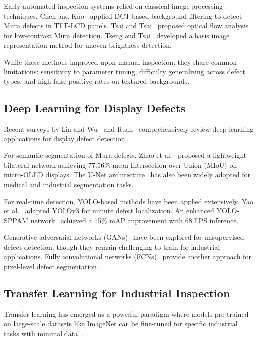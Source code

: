 \documentclass[12pt,a4paper]{article}
\begin{document}
Early automated inspection systems relied on classical image processing 
techniques. Chen and Kuo~\cite{chen2007dct} applied DCT-based background 
filtering to detect Mura defects in TFT-LCD panels. Tsai and Tsai~\cite{tsai2011optical} 
proposed optical flow analysis for low-contrast Mura detection. 
Tseng and Tsai~\cite{tseng2010basis} developed a basis image representation 
method for uneven brightness detection.

While these methods improved upon manual inspection, they share common 
limitations: sensitivity to parameter tuning, difficulty generalizing 
across defect types, and high false positive rates on textured backgrounds.

\subsection{Deep Learning for Display Defects}

Recent surveys by Lin and Wu~\cite{lin2023vision} and Ruan~\cite{ruan2025research} 
comprehensively review deep learning applications for display defect 
detection.

For semantic segmentation of Mura defects, Zhao et al.~\cite{zhao2025lightweight} 
proposed a lightweight bilateral network achieving 77.56\% mean 
Intersection-over-Union (MIoU) on micro-OLED displays. The U-Net 
architecture~\cite{ronneberger2015unet} has also been widely adopted 
for medical and industrial segmentation tasks.

For real-time detection, YOLO-based methods have been applied extensively. 
Yao et al.~\cite{yao2019yolov3} adapted YOLOv3 for minute defect localization. 
An enhanced YOLO-SPPAM network~\cite{chen2025yolo} achieved a 15\% mAP 
improvement with 68 FPS inference.

Generative adversarial networks (GANs)~\cite{goodfellow2014generative} 
have been explored for unsupervised defect detection, though they 
remain challenging to train for industrial applications. Fully 
convolutional networks (FCNs)~\cite{long2015fully} provide another 
approach for pixel-level defect segmentation.

\subsection{Transfer Learning for Industrial Inspection}

Transfer learning has emerged as a powerful paradigm where models 
pre-trained on large-scale datasets like ImageNet can be fine-tuned 
for specific industrial tasks with minimal data~\cite{alzubaidi2021review}.
\end{document}
